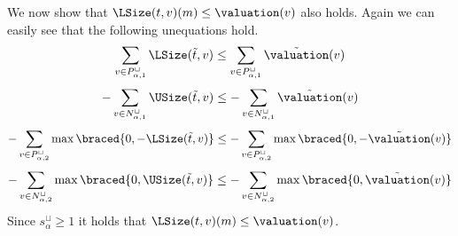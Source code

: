 We now show that $\LSize(t, v)(m) \leq \valuation(v)$ also holds.
Again we can easily see that the following unequations hold.
\[ \sum_{v \in P_{\alpha,1}^\sqcup} \LSize(\tilde{t}, v) \leq \sum_{v \in P_{\alpha,1}^\sqcup} \tilde{\valuation}(v) \]
\[ - \sum_{v \in N_{\alpha,1}^\sqcup} \USize(\tilde{t}, v) \leq - \sum_{v \in N_{\alpha,1}^\sqcup} \tilde{\valuation}(v) \]
\[ - \sum_{v \in P_{\alpha,2}^\sqcup} \max \braced{0,-\LSize(\tilde{t}, v)} \leq - \sum_{v \in P_{\alpha,2}^\sqcup} \max \braced{0,-\tilde{\valuation}(v)} \]
\[ - \sum_{v \in N_{\alpha,2}^\sqcup} \max \braced{0,\USize(\tilde{t}, v)} \leq - \sum_{v \in N_{\alpha,2}^\sqcup} \max \braced{0,\tilde{\valuation}(v)} \]
Since $s^\sqcup_\alpha \geq 1$ it holds that $\LSize(t, v)(m) \leq \valuation(v)$.
